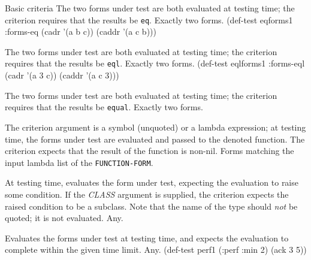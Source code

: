 \begin{criteriaGroup}{Basic criteria}{}
{The two forms under test are both evaluated at testing time; the criterion requires that the results be \texttt{eq}.}
{Exactly two forms.}
{\noExpl}
{\singleEx}{(def-test eqforms1 :forms-eq (cadr '(a b c)) (caddr '(a c b)))}

{The two forms under test are both evaluated at testing time; the criterion requires that the results be \texttt{eql}.}
{Exactly two forms.}
{\noExpl}
{\singleEx}{(def-test eqlforms1 :forms-eql (cadr '(a 3 c)) (caddr '(a c 3)))}

{The two forms under test are both evaluated at testing time; the criterion requires that the results be \texttt{equal}.}
{Exactly two forms.}
{\noExpl}
{\noEx}{}

{The criterion argument is a symbol (unquoted) or a lambda expression;
  at testing time, the forms under test are evaluated and passed to
  the denoted function.  The criterion expects that the result of the
  function is non-nil.}
{Forms matching the input lambda list of the \texttt{FUNCTION-FORM}.}
{\noExpl}
{\multiEx}
{
 }

{At testing time, evaluates the form under test, expecting the
  evaluation to raise some condition.  If the \textit{CLASS} argument
  is supplied, the criterion expects the raised condition to be a
  subclass.  Note that the name of the type should \emph{not} be
  quoted; it is not evaluated.}
{Any.}
{\noExpl}
{\multiEx}
{
 }

{Evaluates the forms under test at testing time, and expects the
  evaluation to complete within the given time limit.}
{Any.}
{\noExpl}
{\singleEx}{(def-test perf1 (:perf :min 2) (ack 3 5))}

\end{criteriaGroup}

